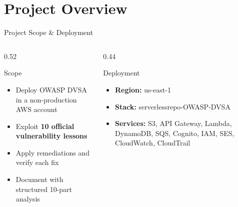 \documentclass[aspectratio=169,10pt]{beamer}
\begin{document}
\section{Project Overview}

\begin{frame}{Project Scope \& Deployment}
\begin{columns}[T]
\begin{column}{0.52\textwidth}
  \begin{block}{ Scope}
    \begin{itemize}
      \item Deploy OWASP DVSA in a non-production AWS account
      \item Exploit \textbf{10 official vulnerability lessons}
      \item Apply remediations and verify each fix
      \item Document with structured 10-part analysis
    \end{itemize}
  \end{block}
\end{column}
\begin{column}{0.44\textwidth}
  \begin{block}{ Deployment}
    \begin{itemize}
      \item \textbf{Region:} us-east-1
      \item \textbf{Stack:} serverlessrepo-OWASP-DVSA
      \item \textbf{Services:} S3, API Gateway, Lambda, DynamoDB, SQS, Cognito, IAM, SES, CloudWatch, CloudTrail
    \end{itemize}
  \end{block}
\end{column}
\end{columns}
\end{frame}
\end{document}

